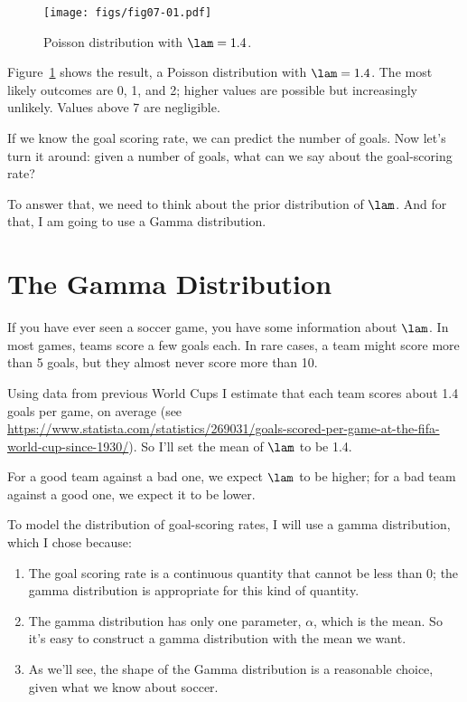 \documentclass[12pt]{book}
\theoremstyle{exercise}
\begin{document}
\begin{figure}
\centerline{\texttt{[image: figs/fig07-01.pdf]}}
\caption{Poisson distribution with $\lam=1.4$.}
\label{fig07-01}
\end{figure}

Figure~\ref{fig07-01} shows the result, a Poisson distribution with $\lam=1.4$.
The most likely outcomes are 0, 1, and 2; higher values are possible but increasingly unlikely.
Values above 7 are negligible.

If we know the goal scoring rate, we can predict the number of goals.
Now let's turn it around: given a number of goals, what can we say about the goal-scoring rate?

To answer that, we need to think about the prior distribution of $\lam$.
And for that, I am going to use a Gamma distribution.


\section{The Gamma Distribution}

If you have ever seen a soccer game, you have some information about $\lam$.
In most games, teams score a few goals each.
In rare cases, a team might score more than 5 goals, but they almost never score more than 10.

Using data from previous World Cups
I estimate that each team scores about 1.4 goals per game, on average (see \url{https://www.statista.com/statistics/269031/goals-scored-per-game-at-the-fifa-world-cup-since-1930/}).  So I'll set the mean of $\lam$ to be 1.4.

For a good team against a bad one, we expect $\lam$ to be higher; for a bad team against a good one, we expect it to be lower.

To model the distribution of goal-scoring rates, I will use a gamma distribution, which I chose because:

\begin{enumerate}

\item The goal scoring rate is a continuous quantity that cannot be less than 0; the gamma distribution is appropriate for this kind of quantity.

\item The gamma distribution has only one parameter, $\alpha$, which is the mean.  So it's easy to construct a gamma distribution with the mean we want.

\item As we'll see, the shape of the Gamma distribution is a reasonable choice, given what we know about soccer.

\end{enumerate}
\end{document}
